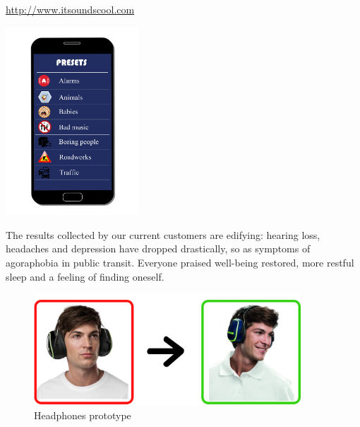 \documentclass[12pt, a4paper]{article}
\newenvironment{Figure}
  {\par\medskip\noindent\minipage{\linewidth}}
  {\endminipage\par\medskip}
\begin{document}
    \url{http://www.itsoundscool.com}

    \begin{multicols}{2}
        \begin{Figure}
        \centering
        \includegraphics[width=5cm]{pictures/AppSoundsCoolPresets.png}
        \end{Figure}

        The results collected by our current customers are edifying: hearing loss, headaches and depression have dropped drastically, so as symptoms of agoraphobia in public transit. Everyone praised well-being restored, more restful sleep and a feeling of finding oneself.

    \end{multicols}



    \begin{figure}[!h]
        \centering
        \includegraphics[width=10cm]{pictures/AppHappy.png}
        \caption{Headphones prototype}
    \end{figure}
\end{document}
